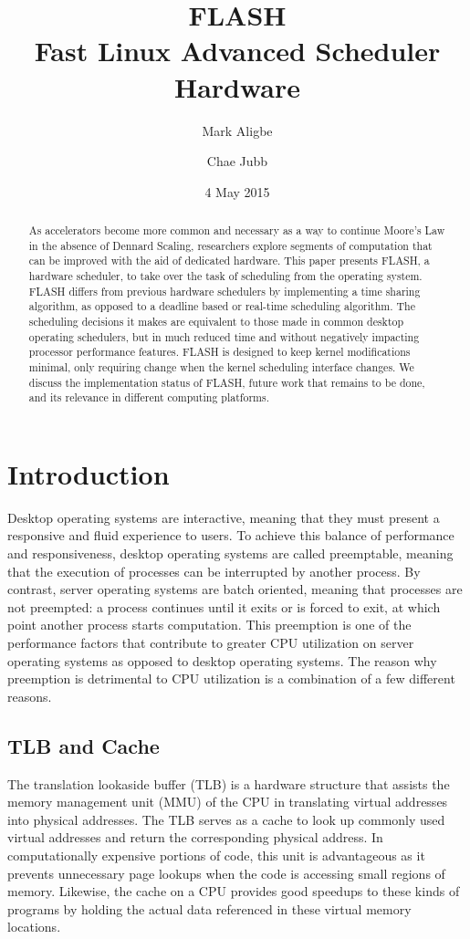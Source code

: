 \documentclass{sig-alternate-10pt}
\title{FLASH\\Fast Linux Advanced Scheduler Hardware}
\author{
	Mark Aligbe \\
	    \email{ma2799@columbia.edu}
	\and
    Chae Jubb \\
        \email{ecj2122@columbia.edu}
}
\date{4 May 2015}
\begin{document}
\maketitle

\begin{abstract}
As accelerators become more common and necessary as a way to continue
Moore's Law in the absence of Dennard Scaling, researchers explore segments
of computation that can be improved with the aid of dedicated hardware. This
paper presents FLASH, a hardware scheduler, to take over the task of
scheduling from the operating system. FLASH differs from previous hardware
schedulers by implementing a time sharing algorithm, as opposed to
a deadline based or real-time scheduling algorithm. The scheduling decisions
it makes are equivalent to those made in common desktop operating
schedulers, but in much reduced time and without negatively impacting
processor performance features. FLASH is designed to keep kernel
modifications minimal, only requiring change when the kernel scheduling
interface changes. We discuss the implementation status of FLASH, future
work that remains to be done, and its relevance in different computing
platforms.

\end{abstract}


\section{Introduction}
\label{sec:intro}
Desktop operating systems are interactive, meaning that they must present
a responsive and fluid experience to users. To achieve this balance of
performance and responsiveness, desktop operating systems are called
preemptable, meaning that the execution of processes can be interrupted by
another process. By contrast, server operating systems are batch oriented,
meaning that processes are not preempted: a process continues until it exits
or is forced to exit, at which point another process starts computation.
This preemption is one of the performance factors that contribute to greater
CPU utilization on server operating systems as opposed to desktop operating
systems. The reason why preemption is detrimental to CPU utilization is
a combination of a few different reasons.

\subsection{TLB and Cache}
The translation lookaside buffer (TLB) is a hardware structure that assists
the memory management unit (MMU) of the CPU in translating virtual addresses
into physical addresses. The TLB serves as a cache to look up commonly used
virtual addresses and return the corresponding physical address. In
computationally expensive portions of code, this unit is advantageous as it
prevents unnecessary page lookups when the code is accessing small regions
of memory. Likewise, the cache on a CPU provides good speedups to these
kinds of programs by holding the actual data referenced in these virtual
memory locations.
\end{document}
